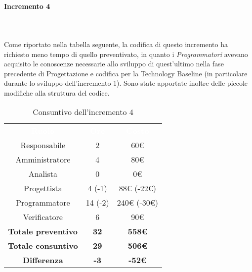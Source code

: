 \paragraph*{Incremento 4} \mbox{} \\ \mbox{} \\
Come riportato nella tabella seguente, la codifica di questo incremento ha richiesto meno tempo di quello preventivato, in quanto i \textit{Programmatori} avevano acquisito le conoscenze necessarie allo sviluppo di quest'ultimo nella fase precedente di Progettazione e codifica per la Technology Baseline (in particolare durante lo sviluppo dell'incremento 1). Sono state apportate inoltre delle piccole modifiche alla struttura del codice.
\begin{table}[H]
\centering\renewcommand{\arraystretch}{1.5}
\caption{Consuntivo dell'incremento 4}
\vspace{0.2cm}
\begin{tabular}{ c c c }
\rowcolor{redafk}
\textcolor{white}{\textbf{Ruolo}} & \textcolor{white}{\textbf{Ore}} &
\textcolor{white}{\textbf{Costo}}  \\
Responsabile 	& 2 & 60€ \\
Amministratore 	&  4 & 80€ \\
Analista 		&  0 & 0€ \\
Progettista		&  4 (-1) & 88€ (-22€)\\
Programmatore	&  14 (-2) & 240€ (-30€)\\
Verificatore 	& 6 & 90€ \\
\textbf{Totale preventivo} & \textbf{32} & \textbf{558€}  \\
\textbf{Totale consuntivo} & \textbf{29} & \textbf{506€}  \\
\rowcolor{lastrowcolor}
\textbf{Differenza} & \textbf{-3} & \textbf{-52€} \\
\end{tabular}
\end{table}

